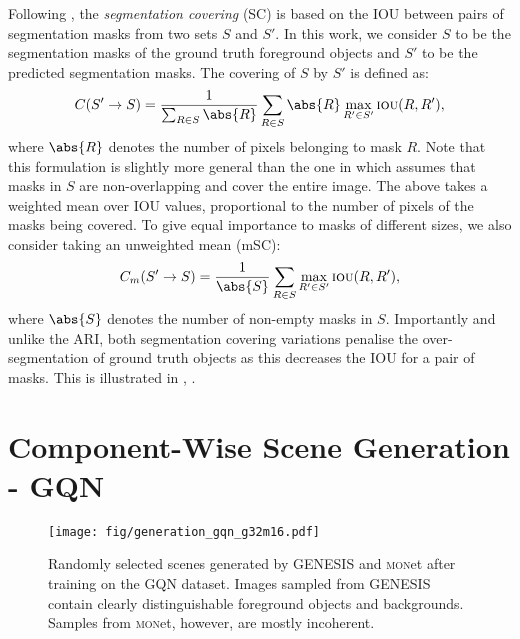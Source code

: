 \documentclass{article}
\begin{document}
Following \citet{arbelaez2010contour}, the \emph{segmentation covering} (SC) is based on the \gls{IOU} between pairs of segmentation masks from two sets $S$ and $S'$.
In this work, we consider $S$ to be the segmentation masks of the ground truth foreground objects and $S'$ to be the predicted segmentation masks.
The covering of $S$ by $S'$ is defined as:
\begin{equation}
    C(S'\rightarrow S) = \frac{1}{\sum_{R \in S} \abs{R}} \sum_{R \in S} \abs{R} \max_{R' \in S'} \operatorname{\textsc{iou}}(R, R'),
\end{equation}
where $\abs{R}$ denotes the number of pixels belonging to mask $R$.
Note that this formulation is slightly more general than the one in \citet{arbelaez2010contour} which assumes that masks in $S$ are non-overlapping and cover the entire image.
The above takes a weighted mean over \gls{IOU} values, proportional to the number of pixels of the masks being covered.
To give equal importance to masks of different sizes, we also consider taking an unweighted mean (mSC):
\begin{equation}
    C_m(S'\rightarrow S) = \frac{1}{\abs{S}} \sum_{R \in S}  \max_{R' \in S'} \operatorname{\textsc{iou}}(R, R'),
\end{equation}
where $\abs{S}$ denotes the number of non-empty masks in $S$. Importantly and unlike the ARI, both segmentation covering variations penalise the over-segmentation of ground truth objects as this decreases the \gls{IOU} for a pair of masks.
This is illustrated in , .


\clearpage















\section{Component-Wise Scene Generation - GQN}
\label{app:generation}


\begin{figure}[h]
    \centering
    \texttt{[image: fig/generation\_gqn\_g32m16.pdf]}
    \caption{Randomly selected scenes generated by \gls{GENESIS} and \textsc{mon}et after training on the GQN dataset.
    Images sampled from \gls{GENESIS} contain clearly distinguishable foreground objects and backgrounds. Samples from \textsc{mon}et, however, are mostly incoherent.}
    \label{fig:generation_gqn_g32m16}
\end{figure}
\end{document}
